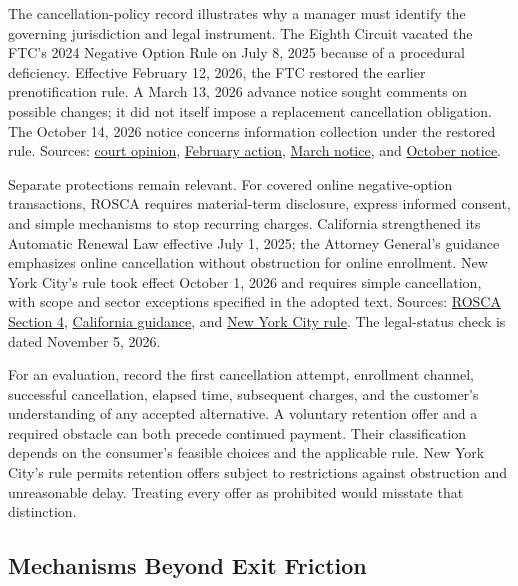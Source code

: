 The cancellation-policy record illustrates why a manager must identify
the governing jurisdiction and legal instrument. The Eighth Circuit
vacated the FTC's 2024 Negative Option Rule on July 8, 2025 because of a
procedural deficiency. Effective February 12, 2026, the FTC restored the
earlier prenotification rule. A March 13, 2026 advance notice sought
comments on possible changes; it did not itself impose a replacement
cancellation obligation. The October 14, 2026 notice concerns
information collection under the restored rule. Sources:
\href{https://ecf.ca8.uscourts.gov/opndir/25/07/243137P.pdf}{court
opinion},
\href{https://www.govinfo.gov/content/pkg/FR-2026-02-12/pdf/2026-02866.pdf}{February
action},
\href{https://www.govinfo.gov/content/pkg/FR-2026-03-13/pdf/2026-04952.pdf}{March
notice}, and
\href{https://www.govinfo.gov/content/pkg/FR-2026-10-14/pdf/2026-20971.pdf}{October
notice}.

Separate protections remain relevant. For covered online negative-option
transactions, ROSCA requires material-term disclosure, express informed
consent, and simple mechanisms to stop recurring charges. California
strengthened its Automatic Renewal Law effective July 1, 2025; the
Attorney General's guidance emphasizes online cancellation without
obstruction for online enrollment. New York City's rule took effect
October 1, 2026 and requires simple cancellation, with scope and sector
exceptions specified in the adopted text. Sources:
\href{https://www.govinfo.gov/content/pkg/PLAW-111publ345/pdf/PLAW-111publ345.pdf}{ROSCA
Section 4},
\href{https://oag.ca.gov/news/press-releases/attorney-general-bonta-issues-consumer-alert-california\%E2\%80\%99s-automatic-renewal-law}{California
guidance}, and
\href{https://www.nyc.gov/content/dam/nycgov/nyc-main/pdf/2026/Click-to-Cancel-Rule.pdf}{New
York City rule}. The legal-status check is dated November 5, 2026.

For an evaluation, record the first cancellation attempt, enrollment
channel, successful cancellation, elapsed time, subsequent charges, and
the customer's understanding of any accepted alternative. A voluntary
retention offer and a required obstacle can both precede continued
payment. Their classification depends on the consumer's feasible choices
and the applicable rule. New York City's rule permits retention offers
subject to restrictions against obstruction and unreasonable delay.
Treating every offer as prohibited would misstate that distinction.

\hypertarget{M08-mechanisms-beyond-exit-friction}{%
\subsection{Mechanisms Beyond Exit
Friction}\label{M08-mechanisms-beyond-exit-friction}}

